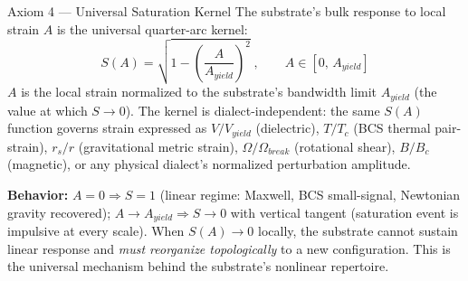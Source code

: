 %
\begin{resultbox}{Axiom 4 — Universal Saturation Kernel}
The substrate's bulk response to local strain $A$ is the universal quarter-arc kernel:
\begin{equation}
    \boxed{S(A) = \sqrt{1 - \left(\frac{A}{A_{yield}}\right)^{\!2}}}\;, \qquad A \in [0,\, A_{yield}]
    \label{eq:axiom4_saturation}
\end{equation}
$A$ is the local strain normalized to the substrate's bandwidth limit $A_{yield}$ (the value at which $S \to 0$). The kernel is dialect-independent: the same $S(A)$ function governs strain expressed as $V/V_{yield}$ (dielectric), $T/T_c$ (BCS thermal pair-strain), $r_s/r$ (gravitational metric strain), $\Omega/\Omega_{break}$ (rotational shear), $B/B_c$ (magnetic), or any physical dialect's normalized perturbation amplitude.

\medskip\noindent
\textbf{Behavior:} $A = 0 \Rightarrow S = 1$ (linear regime: Maxwell, BCS small-signal, Newtonian gravity recovered); $A \to A_{yield} \Rightarrow S \to 0$ with vertical tangent (saturation event is impulsive at every scale). When $S(A) \to 0$ locally, the substrate cannot sustain linear response and \emph{must reorganize topologically} to a new configuration. This is the universal mechanism behind the substrate's nonlinear repertoire.


\end{resultbox}
